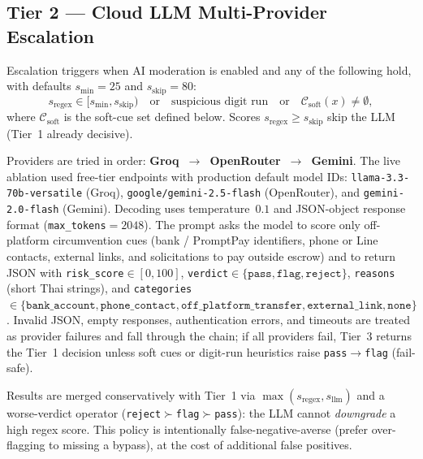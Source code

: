 \documentclass[conference]{IEEEtran}
\begin{document}
\subsection{Tier 2 --- Cloud LLM Multi-Provider Escalation}
Escalation triggers when AI moderation is enabled and any of the following hold,
with defaults $s_{\min}{=}25$ and $s_{\mathrm{skip}}{=}80$:
\begin{equation}
s_{\mathrm{regex}}\in[s_{\min}, s_{\mathrm{skip}})
\quad\text{or}\quad
\text{suspicious digit run}
\quad\text{or}\quad
\mathcal{C}_{\mathrm{soft}}(x)\neq\emptyset,
\end{equation}
where $\mathcal{C}_{\mathrm{soft}}$ is the soft-cue set defined below. Scores
$s_{\mathrm{regex}}\geq s_{\mathrm{skip}}$ skip the LLM (Tier~1 already
decisive).

Providers are tried in order: \textbf{Groq~$\rightarrow$~OpenRouter~$\rightarrow$~Gemini}.
The live ablation used free-tier endpoints with production default model IDs:
\texttt{llama-3.3-70b-versatile} (Groq), \texttt{google/gemini-2.5-flash}
(OpenRouter), and \texttt{gemini-2.0-flash} (Gemini). Decoding uses
temperature~$0.1$ and JSON-object response format (\texttt{max\_tokens}$=2048$).
The prompt asks the model to score only off-platform circumvention cues (bank /
PromptPay identifiers, phone or Line contacts, external links, and solicitations
to pay outside escrow) and to return JSON with
\texttt{risk\_score}$\in[0,100]$,
\texttt{verdict}$\in\{\texttt{pass},\texttt{flag},\texttt{reject}\}$,
\texttt{reasons} (short Thai strings), and
\texttt{categories}$\in\{\texttt{bank\_account},\texttt{phone\_contact},
\texttt{off\_platform\_transfer},\texttt{external\_link},\texttt{none}\}$.
Invalid JSON, empty responses, authentication errors, and timeouts are treated as
provider failures and fall through the chain; if all providers fail, Tier~3
returns the Tier~1 decision unless soft cues or digit-run heuristics raise
\texttt{pass}$\rightarrow$\texttt{flag} (fail-safe).

Results are merged conservatively with Tier~1 via
$\max(s_{\mathrm{regex}}, s_{\mathrm{llm}})$ and a worse-verdict operator
(\texttt{reject}$\succ$\texttt{flag}$\succ$\texttt{pass}): the LLM cannot
\emph{downgrade} a high regex score. This policy is intentionally
false-negative-averse (prefer over-flagging to missing a bypass), at the cost of
additional false positives.
\end{document}
